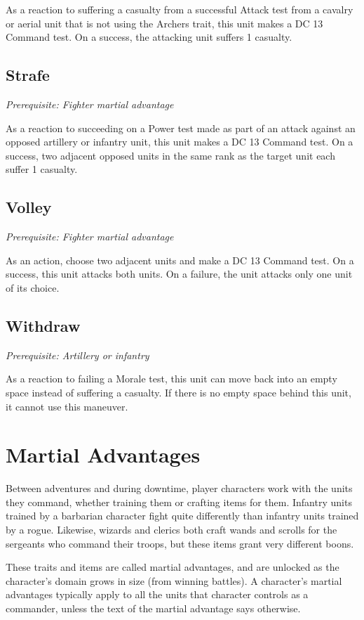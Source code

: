 \documentclass[10pt,a4paper,twoside,bg=print,twocolumn,openany,nodeprecatedcode]{dndbook}
\begin{document}
As a reaction to suffering a casualty from a successful Attack test from a cavalry or aerial unit that is not using the Archers trait, this unit makes a DC 13 Command test. On a success, the attacking unit suffers 1 casualty.

\subsection{Strafe}
\textit{Prerequisite: Fighter martial advantage}

As a reaction to succeeding on a Power test made as part of an attack against an opposed artillery or infantry unit, this unit makes a DC 13 Command test. On a success, two adjacent opposed units in the same rank as the target unit each suffer 1 casualty.

\subsection{Volley}
\textit{Prerequisite: Fighter martial advantage}

As an action, choose two adjacent units and make a DC 13 Command test. On a success, this unit attacks both units. On a failure, the unit attacks only one unit of its choice.

\subsection{Withdraw}
\textit{Prerequisite: Artillery or infantry}

As a reaction to failing a Morale test, this unit can move back into an empty space instead of suffering a casualty. If there is no empty space behind this unit, it cannot use this maneuver.

\section{Martial Advantages}
Between adventures and during downtime, player characters work with the units they command, whether training them or crafting items for them. Infantry units trained by a barbarian character fight quite differently than infantry units trained by a rogue. Likewise, wizards and clerics both craft wands and scrolls for the sergeants who command their troops, but these items grant very different boons.

These traits and items are called martial advantages, and are unlocked as the character's domain grows in size (from winning battles). A character's martial advantages typically apply to all the units that character controls as a commander, unless the text of the martial advantage says otherwise.
\end{document}
